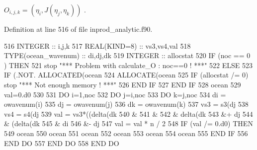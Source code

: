 $ O_{i,j,k} = (\eta_i, J(\eta_j, \eta_k))$ . 

Definition at line 516 of file inprod\+\_\+analytic.\+f90.


\begin{DoxyCode}
516     \textcolor{keywordtype}{INTEGER} :: i,j,k
517     \textcolor{keywordtype}{REAL(KIND=8)} :: vs3,vs4,val
518     \textcolor{keywordtype}{TYPE}(ocean\_wavenum) :: di,dj,dk
519     \textcolor{keywordtype}{INTEGER} :: allocstat 
520     \textcolor{keywordflow}{IF} (noc == 0 ) \textcolor{keywordflow}{THEN}
521        stop \textcolor{stringliteral}{"*** Problem with calculate\_O : noc==0 ! ***"}
522     \textcolor{keywordflow}{ELSE}
523        \textcolor{keywordflow}{IF} (.NOT. \textcolor{keyword}{ALLOCATED}(ocean%
524           \textcolor{keyword}{ALLOCATE}(ocean%
525           \textcolor{keywordflow}{IF} (allocstat /= 0) stop \textcolor{stringliteral}{"*** Not enough memory ! ***"}
526 \textcolor{keywordflow}{       END IF}
527 \textcolor{keywordflow}{    END IF}
528     ocean%
529     val=0.d0
530 
531     \textcolor{keywordflow}{DO} i=1,noc
532        \textcolor{keywordflow}{DO} j=i,noc
533           \textcolor{keywordflow}{DO} k=j,noc
534              di = owavenum(i)
535              dj = owavenum(j)
536              dk = owavenum(k)
537              vs3 = s3(dj%
538              vs4 = s4(dj%
539              val = vs3*((delta(dk%
540                   &%
541                   &%
542                   & delta(dk%
543                   &+ dj%
544                   & (delta(dk%
545                   & di%
546                   &- dj%
547              val = val * n / 2
548              \textcolor{keywordflow}{IF} (val /= 0.d0) \textcolor{keywordflow}{THEN}
549                 ocean%
550                 ocean%
551                 ocean%
552                 ocean%
553                 ocean%
554                 ocean%
555 \textcolor{keywordflow}{             END IF}
556 \textcolor{keywordflow}{          END DO}
557 \textcolor{keywordflow}{       END DO}
558 \textcolor{keywordflow}{    END DO}
\end{DoxyCode}
